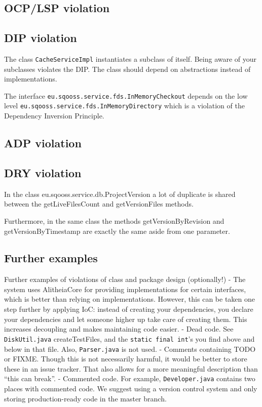 \documentclass{article}
\begin{document}
\subsection{OCP/LSP violation}

\subsection{DIP violation}
The class \verb|CacheServiceImpl| instantiates a subclass of itself. Being aware of your subclasses violates the DIP. The class should depend on abstractions instead of implementations.

The interface \verb|eu.sqooss.service.fds.InMemoryCheckout| depends on the low level \verb|eu.sqooss.service.fds.InMemoryDirectory| which is a violation of the Dependency Inversion Principle. %

\subsection{ADP violation}

\subsection{DRY violation}
In the class eu.sqooss.service.db.ProjectVersion a lot of duplicate is shared between the getLiveFilesCount and getVersionFiles methods. 

Furthermore, in the same class the methods getVersionByRevision and getVersionByTimestamp are exactly the same aside from one parameter.


\subsection{Further examples}
Further examples of violations of class and package design (optionally!)
 - The system uses AlitheiaCore for providing implementations for certain interfaces, which is better than relying on implementations. However, this can be taken one step further by applying IoC: instead of creating your dependencies, you declare your dependencies and let someone higher up take care of creating them. This increases decoupling and makes maintaining code easier.
 - Dead code. See \verb|DiskUtil.java| createTestFiles, and the \verb|static final int|'s you find above and below in that file. Also, \verb|Parser.java| is not used.
 - Comments containing TODO or FIXME. Though this is not necessarily harmful, it would be better to store these in an issue tracker. That also allows for a more meaningful description than ``this can break''.
 - Commented code. For example, \verb|Developer.java| contains two places with commented code. We suggest using a version control system and only storing production-ready code in the master branch.

{}

\end{document}
